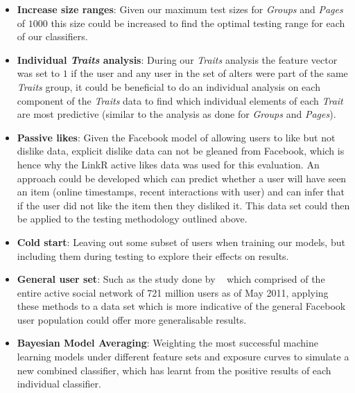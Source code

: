 \begin{itemize}
\item \textbf{Increase size ranges}: Given our maximum test sizes for \emph{Groups} and \emph{Pages} of $1000$ this size could be 
increased to find the optimal testing range for each of our classifiers.
\item \textbf{Individual \emph{Traits} analysis}: During our \emph{Traits} analysis the feature vector was set to $1$ if the user and any user in 
the set of alters were part of the same \emph{Traits} group, it could be beneficial to do an individual analysis on each component of 
the \emph{Traits} data to find which individual elements of each \emph{Trait} are most predictive (similar to the analysis as done for \emph{Groups} and \emph{Pages}).
\item \textbf{Passive likes}: Given the Facebook model of allowing users to like but not dislike data, explicit dislike data can not be gleaned
from Facebook, which is hence why the LinkR active likes data was used for this evaluation. An approach could be developed which can predict 
whether a user will have seen an item (online timestamps, recent interactions with user) and can infer that if the user did not like the item then
they disliked it. This data set could then be applied to the testing methodology outlined above.
\item \textbf{Cold start}: Leaving out some subset of users when training our models, but including them during testing to explore their 
effects on results.
\item \textbf{General user set}: Such as the study done by ~\cite{jugand} which comprised of the entire active social network of 721 million users 
as of May 2011, applying these methods to a data set which is more indicative of the general Facebook user population could offer more generalisable 
results.
\item \textbf{Bayesian Model Averaging}: Weighting the most successful machine learning models under different feature sets and exposure curves 
to simulate a new combined classifier, which has learnt from the positive results of each individual classifier.
\end{itemize}

